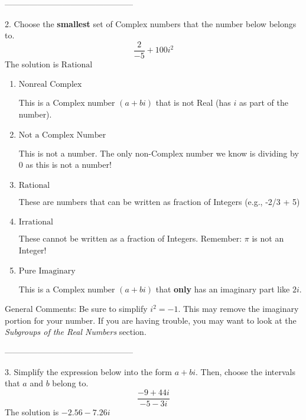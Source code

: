 \documentclass{extbook}[14pt]
\begin{document}
-----------------------------------------------

2. Choose the \textbf{smallest} set of Complex numbers that the number below belongs to.
\[ \frac{2}{-5}+100i^2 \] 
The solution is $ \text{Rational} $ 

\begin{enumerate}[label=\Alph*.] 
\item $ \text{Nonreal Complex} $ 

 This is a Complex number $(a+bi)$ that is not Real (has $i$ as part of the number). 
\item $ \text{Not a Complex Number} $ 

 This is not a number. The only non-Complex number we know is dividing by 0 as this is not a number! 
\item $ \text{Rational} $ 

 These are numbers that can be written as fraction of Integers (e.g., -2/3 + 5) 
\item $ \text{Irrational} $ 

 These cannot be written as a fraction of Integers. Remember: $\pi$ is not an Integer! 
\item $ \text{Pure Imaginary} $ 

 This is a Complex number $(a+bi)$ that \textbf{only} has an imaginary part like $2i$. 
\end{enumerate} 
 
General Comments: Be sure to simplify $i^2 = -1$. This may remove the imaginary portion for your number. If you are having trouble, you may want to look at the \textit{Subgroups of the Real Numbers} section.

-----------------------------------------------

3. Simplify the expression below into the form $a+bi$. Then, choose the intervals that $a$ and $b$ belong to.
\[ \frac{-9  + 44 i}{-5  - 3 i} \] 
The solution is $ -2.56  - 7.26 i $ 
\end{document}
